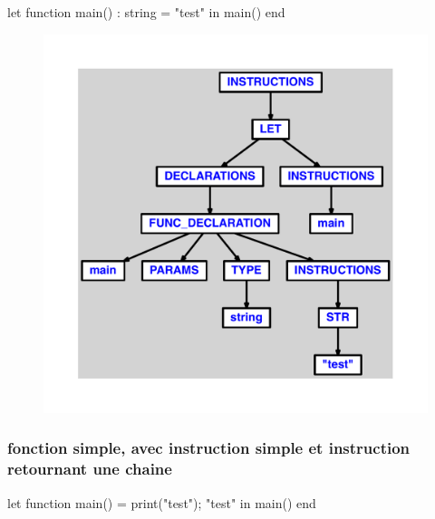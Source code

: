 \documentclass{article}
\begin{document}
\begin{verbatimtab}
let
	function main() : string = "test"
in main() end
\end{verbatimtab}
\begin{figure}[H]\centering\includegraphics[max width=\textwidth]{ast/ast_229.pdf}\end{figure}\subsubsection{fonction simple, avec instruction simple et instruction retournant une chaine}
\begin{verbatimtab}
let
	function main() =
		print("test");
		"test"
in main() end
\end{verbatimtab}
\end{document}
